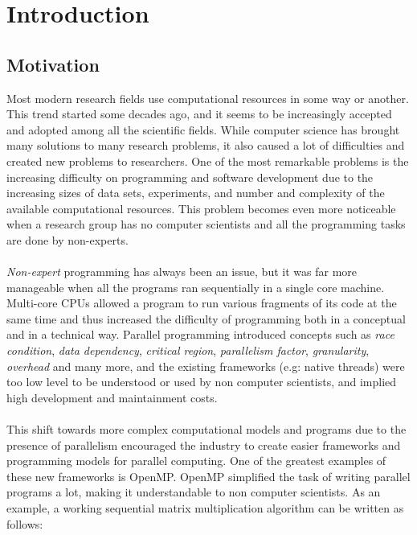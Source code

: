 \section{Introduction}
\label{sec:introduction}

\subsection{Motivation}
\label{subsec:intro_motivation}
Most modern research fields use computational resources in some way or another. This trend started some decades ago, and it seems to be increasingly accepted and adopted among all the scientific fields. While computer science has brought many solutions to many research problems, it also caused a lot of difficulties and created new problems to researchers. One of the most remarkable problems is the increasing difficulty on programming and software development due to the increasing sizes of data sets, experiments, and number and complexity of the available computational resources. This problem becomes even more noticeable when a research group has no computer scientists and all the programming tasks are done by non-experts.\\
\\
\textit{Non-expert} programming has always been an issue, but it was far more manageable when all the programs ran sequentially in a single core machine. Multi-core CPUs allowed a program to run various fragments of its code at the same time and thus increased the difficulty of programming both in a conceptual and in a technical way. Parallel programming introduced concepts such as \textit{race condition}, \textit{data dependency}, \textit{critical region}, \textit{parallelism factor}, \textit{granularity}, \textit{overhead} and many more, and the existing frameworks (e.g: native threads) were too low level to be understood or used by non computer scientists, and implied high development and maintainment costs.\\
\\
This shift towards more complex computational models and programs due to the presence of parallelism encouraged the industry to create easier frameworks and programming models for parallel computing. One of the greatest examples of these new frameworks is OpenMP\cite{openmp08}. OpenMP simplified the task of writing parallel programs a lot, making it understandable to non computer scientists. As an example, a working sequential matrix multiplication algorithm can be written as follows:
\inputminted{c}{snippets/matmul_openmp.cc}
